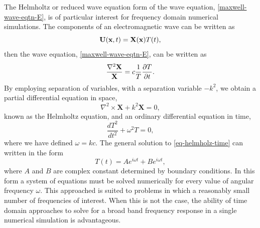 The Helmholtz or reduced wave equation form of the wave equation, \eqref{maxwell-wave-eqtn-E}, is of particular interest for frequency domain numerical simulations. The components of an electromagnetic wave can be written as
$$
\mathbf{U}(\mathbf{x},t) = \mathbf{X}(\mathbf{x}) T(t),
$$
then the wave equation, \eqref{maxwell-wave-eqtn-E}, can be written as
\begin{equation}
\label{eq:helmholz-space}
\frac{\nabla^2 \mathbf{X}}{\mathbf{X}} = c \frac{1}{T} \frac{\partial T}{\partial t} .
\end{equation}
By employing separation of variables, with a separation variable $-k^2$, we obtain a partial differential equation in space,
\begin{equation}
\nabla^2 \times \mathbf{X} + k^2 \mathbf{X} = 0 ,
\label{eq-helmholz-time}
\end{equation}
known as the Helmholtz equation, and an ordinary differential equation in time,
\begin{equation}
\frac{d T ^2}{d t ^2} + \omega ^2 T  = 0 ,
\label{eq-helmholz-time}
\end{equation}
where we have defined $\omega = k c$. The general solution to \eqref{eq-helmholz-time} can written in the form
\begin{equation}
\label{eq:helmholtz-time-soltn}
T(t) = A e^{i \omega t} + B e^{i \omega t},
\end{equation}
where $A$ and $B$ are complex constant determined by boundary conditions. In this form a system of equations must be solved numerically for every value of angular frequency $\omega$. This approached is suited to problems in which a reasonably small number of frequencies of interest. When this is not the case, the ability of time domain approaches to solve for a broad band frequency response in a single numerical simulation is advantageous.

